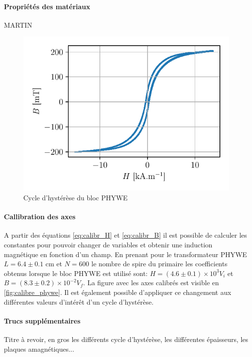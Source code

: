 \paragraph{Propriétés des matériaux}
MARTIN

\begin{minipage}{\linewidth}
    \begin{figure}
        \includegraphics[width=\linewidth]{figures/G1-phywe-avec-bloc_chang.pdf}
        \caption{Cycle d'hystérèse du bloc PHYWE}
        \label{fig:calibr_phywe}
    \end{figure}

    \paragraph{Callibration des axes}
    A partir des équations \autoref{eq:calibr_H} et \autoref{eq:calibr_B} il est possible de calculer les constantes pour pouvoir changer de variables et obtenir une induction magnétique en fonction d'un champ. En prenant pour le transformateur PHYWE \(L = 6.4 \pm 0.1\) \si{\centi \meter} et \(N = 600\) le nombre de spire du primaire les coefficients obtenus lorsque le bloc PHYWE est utilisé sont: \(H = (4.6\pm0.1)\times10^3 V_i\) et \(B = (8.3\pm0.2)\times10^{-2} V_f\). La figure avec les axes calibrés est visible en \autoref{fig:calibre_phywe}.
    Il est également possible d'appliquer ce changement aux différentes valeurs d'intérêt d'un cycle d'hystérèse. 
\end{minipage}






\paragraph{Trucs supplémentaires}
Titre à revoir, en gros les différents cycle d'hystérèse, les différentes épaisseurs, les plaques amagnétiques...


